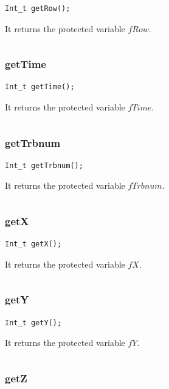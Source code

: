 \documentclass[a4paper]{book}
\begin{document}
\begin{lstlisting}[style=customc]
Int_t getRow();
\end{lstlisting}

It returns the protected variable $fRow$.

\[\]

\subsubsection{getTime}

\begin{lstlisting}[style=customc]
Int_t getTime();
\end{lstlisting}

It returns the protected variable $fTime$.

\[\]

\subsubsection{getTrbnum}

\begin{lstlisting}[style=customc]
Int_t getTrbnum();
\end{lstlisting}

It returns the protected variable $fTrbnum$.

\[\]

\subsubsection{getX}

\begin{lstlisting}[style=customc]
Int_t getX();
\end{lstlisting}

It returns the protected variable $fX$.

\[\]

\subsubsection{getY}

\begin{lstlisting}[style=customc]
Int_t getY();
\end{lstlisting}

It returns the protected variable $fY$.

\[\]

\subsubsection{getZ}
\end{document}
